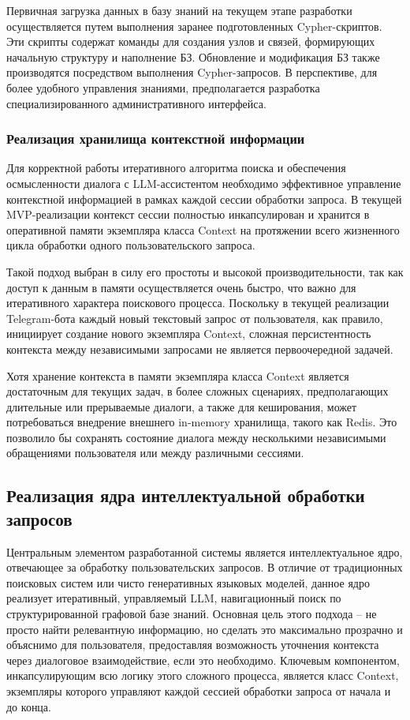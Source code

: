 Первичная загрузка данных в базу знаний на текущем этапе разработки осуществляется путем выполнения заранее подготовленных Cypher-скриптов. Эти скрипты содержат команды для создания узлов и связей, формирующих начальную структуру и наполнение БЗ. Обновление и модификация БЗ также производятся посредством выполнения Cypher-запросов. В перспективе, для более удобного управления знаниями, предполагается разработка специализированного административного интерфейса.

\subsubsection{Реализация хранилища контекстной информации}

Для корректной работы итеративного алгоритма поиска и обеспечения осмысленности диалога с LLM-ассистентом необходимо эффективное управление контекстной информацией в рамках каждой сессии обработки запроса. В текущей MVP-реализации контекст сессии полностью инкапсулирован и хранится в оперативной памяти экземпляра класса Context на протяжении всего жизненного цикла обработки одного пользовательского запроса.

Такой подход выбран в силу его простоты и высокой производительности, так как доступ к данным в памяти осуществляется очень быстро, что важно для итеративного характера поискового процесса. Поскольку в текущей реализации Telegram-бота каждый новый текстовый запрос от пользователя, как правило, инициирует создание нового экземпляра Context, сложная персистентность контекста между независимыми запросами не является первоочередной задачей.

Хотя хранение контекста в памяти экземпляра класса Context является достаточным для текущих задач, в более сложных сценариях, предполагающих длительные или прерываемые диалоги, а также для кеширования, может потребоваться внедрение внешнего in-memory хранилища, такого как Redis. Это позволило бы сохранять состояние диалога между несколькими независимыми обращениями пользователя или между различными сессиями.

\subsection{Реализация ядра интеллектуальной обработки запросов}

Центральным элементом разработанной системы является интеллектуальное ядро, отвечающее за обработку пользовательских запросов. В отличие от традиционных поисковых систем или чисто генеративных языковых моделей, данное ядро реализует итеративный, управляемый LLM, навигационный поиск по структурированной графовой базе знаний. Основная цель этого подхода – не просто найти релевантную информацию, но сделать это максимально прозрачно и объяснимо для пользователя, предоставляя возможность уточнения контекста через диалоговое взаимодействие, если это необходимо. Ключевым компонентом, инкапсулирующим всю логику этого сложного процесса, является класс Context, экземпляры которого управляют каждой сессией обработки запроса от начала и до конца.


